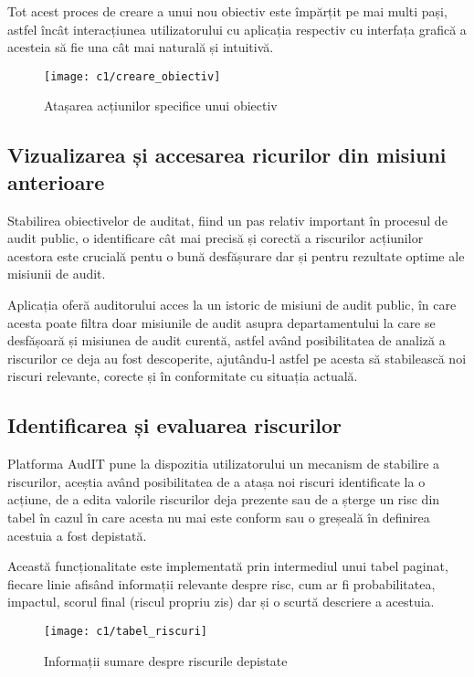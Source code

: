 Tot acest proces  de creare a unui nou obiectiv este împărțit pe mai multi pași, astfel încât interacțiunea utilizatorului cu aplicația respectiv cu interfața grafică a acesteia să fie una cât mai naturală și intuitivă.
\vspace{1cm}
\begin{figure}[h]
	\centering
	
	\texttt{[image: c1/creare\_obiectiv]}
	\caption{Atașarea acțiunilor specifice unui obiectiv}
\end{figure}

\subsection{Vizualizarea și accesarea ricurilor din misiuni anterioare}

Stabilirea obiectivelor de auditat, fiind un pas relativ important în procesul de audit public, o identificare cât mai precisă și corectă a riscurilor acțiunilor acestora este crucială pentu o bună desfășurare dar și pentru rezultate optime ale misiunii de audit.

Aplicația oferă auditorului acces la un istoric de misiuni de audit public, în care acesta poate filtra doar misiunile de audit asupra departamentului la care se desfășoară și misiunea de audit curentă, astfel având posibilitatea de analiză a riscurilor ce deja au fost descoperite, ajutându-l 
astfel pe acesta să stabilească noi riscuri relevante, corecte și în conformitate cu situația actuală.

\subsection{Identificarea și evaluarea riscurilor}
Platforma AudIT pune la dispozitia utilizatorului un mecanism de stabilire a riscurilor, aceștia având posibilitatea de a atașa noi riscuri identificate la o acțiune, de a edita valorile riscurilor deja prezente sau de a șterge un risc din tabel în cazul în care acesta nu mai este conform sau o greșeală în definirea acestuia a fost depistată.

Această funcționalitate este implementată prin intermediul unui tabel paginat, fiecare linie afisând informații relevante despre risc, cum ar fi probabilitatea, impactul, scorul final (riscul propriu zis) dar și o scurtă descriere a acestuia.

\vspace{1cm}
\begin{figure}[h]
	\centering
	
	\texttt{[image: c1/tabel\_riscuri]}
	\caption{Informații sumare despre riscurile depistate}
\end{figure}

